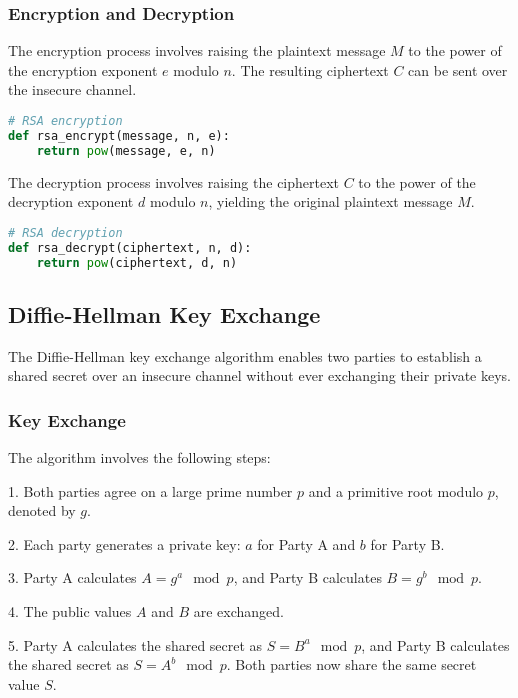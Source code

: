 \documentclass{article}
\begin{document}
\subsubsection{Encryption and Decryption}

The encryption process involves raising the plaintext message $M$ to the power of the encryption exponent $e$ modulo $n$. The resulting ciphertext $C$ can be sent over the insecure channel.

\begin{lstlisting}[language=Python]
# RSA encryption
def rsa_encrypt(message, n, e):
    return pow(message, e, n)
\end{lstlisting}

The decryption process involves raising the ciphertext $C$ to the power of the decryption exponent $d$ modulo $n$, yielding the original plaintext message $M$.

\begin{lstlisting}[language=Python]
# RSA decryption
def rsa_decrypt(ciphertext, n, d):
    return pow(ciphertext, d, n)
\end{lstlisting}

\subsection{Diffie-Hellman Key Exchange}

The Diffie-Hellman key exchange algorithm enables two parties to establish a shared secret over an insecure channel without ever exchanging their private keys.

\subsubsection{Key Exchange}

The algorithm involves the following steps:

1. Both parties agree on a large prime number $p$ and a primitive root modulo $p$, denoted by $g$.

2. Each party generates a private key: $a$ for Party A and $b$ for Party B.

3. Party A calculates $A = g^a \mod p$, and Party B calculates $B = g^b \mod p$.

4. The public values $A$ and $B$ are exchanged.

5. Party A calculates the shared secret as $S = B^a \mod p$, and Party B calculates the shared secret as $S = A^b \mod p$. Both parties now share the same secret value $S$.
\end{document}
